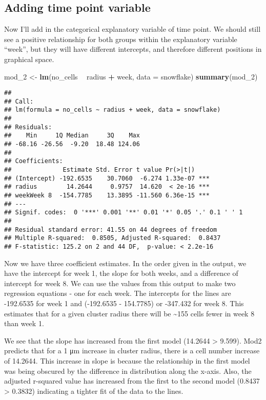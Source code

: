\documentclass[]{article}
\newenvironment{Shaded}{\begin{snugshade}}{\end{snugshade}}
\newcommand{\KeywordTok}[1]{\textcolor[rgb]{0.13,0.29,0.53}{\textbf{#1}}}
\newcommand{\DataTypeTok}[1]{\textcolor[rgb]{0.13,0.29,0.53}{#1}}
\newcommand{\DecValTok}[1]{\textcolor[rgb]{0.00,0.00,0.81}{#1}}
\newcommand{\StringTok}[1]{\textcolor[rgb]{0.31,0.60,0.02}{#1}}
\newcommand{\OperatorTok}[1]{\textcolor[rgb]{0.81,0.36,0.00}{\textbf{#1}}}
\newcommand{\NormalTok}[1]{#1}
\begin{document}
\subsection{Adding time point
variable}\label{adding-time-point-variable}

Now I'll add in the categorical explanatory variable of time point. We
should still see a positive relationship for both groups within the
explanatory variable ``week'', but they will have different intercepts,
and therefore different positions in graphical space.

\begin{Shaded}
\begin{Highlighting}[]
\NormalTok{mod_}\DecValTok{2}\NormalTok{ <-}\StringTok{ }\KeywordTok{lm}\NormalTok{(no_cells }\OperatorTok{~}\StringTok{ }\NormalTok{radius }\OperatorTok{+}\StringTok{ }\NormalTok{week, }\DataTypeTok{data =}\NormalTok{ snowflake)}
\KeywordTok{summary}\NormalTok{(mod_}\DecValTok{2}\NormalTok{)}
\end{Highlighting}
\end{Shaded}

\begin{verbatim}
## 
## Call:
## lm(formula = no_cells ~ radius + week, data = snowflake)
## 
## Residuals:
##    Min     1Q Median     3Q    Max 
## -68.16 -26.56  -9.20  18.48 124.06 
## 
## Coefficients:
##              Estimate Std. Error t value Pr(>|t|)    
## (Intercept) -192.6535    30.7060  -6.274 1.33e-07 ***
## radius        14.2644     0.9757  14.620  < 2e-16 ***
## weekWeek 8  -154.7785    13.3895 -11.560 6.36e-15 ***
## ---
## Signif. codes:  0 '***' 0.001 '**' 0.01 '*' 0.05 '.' 0.1 ' ' 1
## 
## Residual standard error: 41.55 on 44 degrees of freedom
## Multiple R-squared:  0.8505, Adjusted R-squared:  0.8437 
## F-statistic: 125.2 on 2 and 44 DF,  p-value: < 2.2e-16
\end{verbatim}

Now we have three coefficient estimates. In the order given in the
output, we have the intercept for week 1, the slope for both weeks, and
a difference of intercept for week 8. We can use the values from this
output to make two regression equations - one for each week. The
intercepts for the lines are -192.6535 for week 1 and (-192.6535 -
154.7785) or -347.432 for week 8. This estimates that for a given
cluster radius there will be \textasciitilde{}155 cells fewer in week 8
than week 1.

We see that the slope has increased from the first model (14.2644
\textgreater{} 9.599). Mod2 predicts that for a 1 μm increase in cluster
radius, there is a cell number increase of 14.2644. This increase in
slope is because the relationship in the first model was being obscured
by the difference in distribution along the x-axis. Also, the adjusted
r-squared value has increased from the first to the second model (0.8437
\textgreater{} 0.3832) indicating a tighter fit of the data to the
lines.
\end{document}
